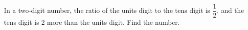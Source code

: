 In a two-digit number, the ratio of the units digit to the tens digit is $\dfrac{1}{2}$, and the tens digit is $2$ more than the units digit. Find the number.
